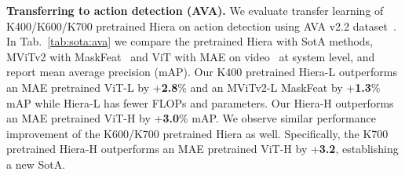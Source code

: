 \documentclass[nohyperref]{article}
\renewcommand{\paragraph}[1]{\vspace{1.25mm}\noindent\textbf{#1}}
\newcommand{\shortname}{{Hiera}}
\theoremstyle{plain}
\theoremstyle{definition}
\theoremstyle{remark}
\begin{document}
\paragraph{Transferring to action detection (AVA).} We evaluate transfer learning of K400/K600/K700 pretrained \shortname{} on action detection using AVA v2.2 dataset~\cite{gu2018ava}. In Tab.~\ref{tab:sota:ava} we compare the pretrained \shortname{} with SotA methods, MViTv2 with MaskFeat~\cite{maskfeat} and ViT with MAE on video~\cite{tong2022videomae,mae-st} at system level, and report mean average precision (mAP). Our K400 pretrained \shortname{}-L outperforms an MAE pretrained ViT-L by +\textbf{2.8}\% and an MViTv2-L MaskFeat by +\textbf{1.3}\% mAP while \shortname{}-L has fewer FLOPs and parameters. Our \shortname{}-H outperforms an MAE pretrained ViT-H by +\textbf{3.0}\% mAP. We observe similar performance improvement of the K600/K700 pretrained \shortname{} as well. Specifically, the K700 pretrained \shortname{}-H outperforms an MAE pretrained ViT-H by +\textbf{3.2}, establishing a new SotA.
\end{document}
